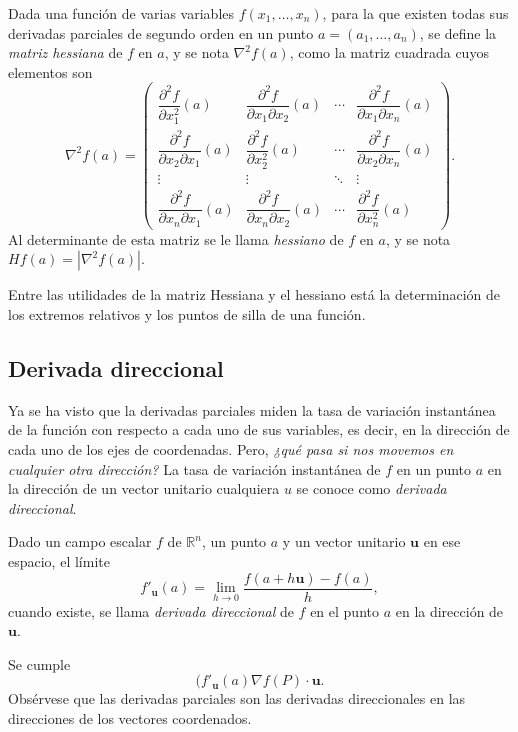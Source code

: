 \begin{definicion}
Dada una función de varias variables $f(x_1,\ldots,x_n)$, para la que existen todas sus derivadas parciales de segundo
orden en un punto $a=(a_1,\ldots,a_n)$, se define la \emph{matriz hessiana} de $f$ en $a$, y se nota $\nabla^2f(a)$, como la
matriz cuadrada cuyos elementos son
\[
\nabla^2f(a)=\left(
\begin{array}{cccc}
\dfrac{\partial^2 f}{\partial x_1^2}(a) & 
\dfrac{\partial^2 f}{\partial x_1 \partial x_2}(a) &
\cdots &
\dfrac{\partial^2 f}{\partial x_1 \partial x_n}(a)\\
\dfrac{\partial^2 f}{\partial x_2 \partial x_1}(a) &
\dfrac{\partial^2 f}{\partial x_2^2}(a) & 
\cdots &
\dfrac{\partial^2 f}{\partial x_2 \partial x_n}(a)\\
\vdots & \vdots & \ddots & \vdots \\
\dfrac{\partial^2 f}{\partial x_n \partial x_1}(a) &
\dfrac{\partial^2 f}{\partial x_n \partial x_2}(a) &
\cdots &
\dfrac{\partial^2 f}{\partial x_n^2}(a)
\end{array}
\right).
\]
Al determinante de esta matriz se le llama \emph{hessiano} de $f$ en $a$, y se nota $Hf(a)=|\nabla^2f(a)|$.
\end{definicion}

Entre las utilidades de la matriz Hessiana y el hessiano está la determinación de los extremos relativos y los puntos de
silla de una función. 

\subsection{Derivada direccional}
Ya se ha visto que la derivadas parciales miden la tasa de variación instantánea de la función con respecto a cada uno
de sus variables, es decir, en la dirección de cada uno de los ejes de coordenadas. 
Pero, \emph {¿qué pasa si nos movemos en cualquier otra dirección?}
La tasa de variación instantánea de $f$ en un punto $a$ en la dirección de un vector unitario cualquiera $u$ se conoce
como \emph{derivada direccional}.

\begin{definicion}
Dado un campo escalar $f$ de $\mathbb{R}^n$, un punto $a$ y un vector unitario $\mathbf{u}$ en ese espacio, el límite
\[
f'_{\mathbf{u}}(a) = \lim_{h\rightarrow 0}\frac{f(a+h\mathbf{u})-f(a)}{h},
\] 
cuando existe, se llama \emph{derivada direccional} de $f$ en el punto $a$ en la dirección de $\mathbf{u}$.
\end{definicion}
Se cumple 
\[
(f'_{\mathbf{u}}(a) \nabla f(P)\cdot \mathbf{u}.
\]
Obsérvese que las derivadas parciales son las derivadas direccionales en las direcciones de los vectores coordenados.

